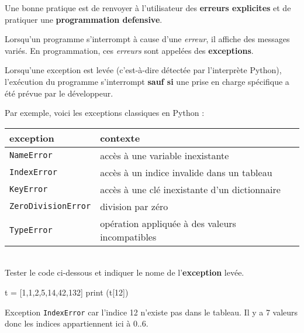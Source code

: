 \documentclass[a4paper,17pt]{extarticle}
\newenvironment{eleve}%
{\begin{activite}\color{noiramu}\\[-0.5cm]}
{\end{activite}}
\newenvironment{Shaded}{}{}
\newcommand{\DecValTok}[1]{\textcolor[rgb]{0.25,0.63,0.44}{{#1}}}
\newcommand{\NormalTok}[1]{{#1}}
\newcommand{\OperatorTok}[1]{\textcolor[rgb]{0.40,0.40,0.40}{{#1}}}
\newcommand{\BuiltInTok}[1]{{#1}}
\begin{document}
Une bonne pratique est de renvoyer à l'utilisateur des \textbf{erreurs
explicites} et de pratiquer une \textbf{programmation defensive}.
\begin{retenir}
    Lorsqu'un programme s'interrompt à cause d'une \emph{erreur}, il affiche
des messages variés. En programmation, ces \emph{erreurs} sont appelées
des \textbf{exceptions}.

        \end{retenir}
    Lorsqu'une exception est levée (c'est-à-dire détectée par l'interprète
Python), l'exécution du programme s'interrompt \textbf{sauf si} une
prise en charge spécifique a été prévue par le développeur.
\begin{exemple}
    Par exemple, voici les exceptions classiques en Python :

\begin{longtable}[]{@{}ll@{}}
\toprule
exception & contexte\tabularnewline
\midrule
\endhead
\texttt{NameError} & accès à une variable inexistante\tabularnewline
\texttt{IndexError} & accès à un indice invalide dans un
tableau\tabularnewline
\texttt{KeyError} & accès à une clé inexistante d'un
dictionnaire\tabularnewline
\texttt{ZeroDivisionError} & division par zéro\tabularnewline
\texttt{TypeError} & opération appliquée à des valeurs
incompatibles\tabularnewline
\bottomrule
\end{longtable}

        \end{exemple}\begin{eleve}
    Tester le code ci-dessous et indiquer le nome de l'\textbf{exception}
levée.

\begin{Shaded}
\begin{Highlighting}[]
\NormalTok{t }\OperatorTok{=}\NormalTok{ [}\DecValTok{1}\NormalTok{,}\DecValTok{1}\NormalTok{,}\DecValTok{2}\NormalTok{,}\DecValTok{5}\NormalTok{,}\DecValTok{14}\NormalTok{,}\DecValTok{42}\NormalTok{,}\DecValTok{132}\NormalTok{]}
\BuiltInTok{print}\NormalTok{ (t[}\DecValTok{12}\NormalTok{])}
\end{Highlighting}
\end{Shaded}
        
        \end{eleve}\begin{reponse}
    Exception \texttt{IndexError} car l'indice 12 n'existe pas dans le
tableau. Il y a 7 valeurs donc les indices appartiennent ici à 0..6.

        \end{reponse}
\end{document}
